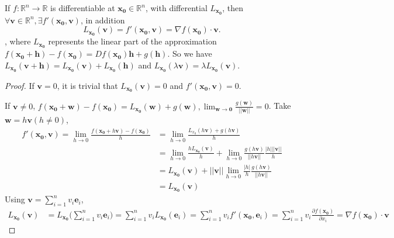 \begin{proposition}
    If $f: \mathbb{R}^{n} \to \mathbb{R}$ is differentiable at $\mathbf{x_0}\in \mathbb{R}^{n}$, with differential $L_\mathbf{x_0}$, then $\forall \mathbf{v} \in \mathbb{R}^{n}, \exists f'(\mathbf{x_0}, \mathbf{v})$, in addition \[
        L_\mathbf{x_0}(\mathbf{v}) = f'(\mathbf{x_0},\mathbf{v})= \nabla f(\mathbf{x_0}) \cdot \mathbf{v}.
    \]
    , where $L_\mathbf{x_0}$ represents the linear part of the approximation $f(\mathbf{x_0}+\mathbf{h})-f(\mathbf{x_0}) = Df(\mathbf{x_0})\mathbf{h}+g(\mathbf{h})$. So we have $L_\mathbf{x_0}(\mathbf{v} + \mathbf{h})= L_\mathbf{x_0}(\mathbf{v})+L_\mathbf{x_0}(\mathbf{h})$ and $L_\mathbf{x_0}(\lambda \mathbf{v})=\lambda L_\mathbf{x_0}(\mathbf{v})$.
\end{proposition}

\begin{proof}
    If $\mathbf{v} = 0$, it is trivial that $L_{\mathbf{x_0}}(\mathbf{v}) = 0$ and $f'(\mathbf{x_0},\mathbf{v}) = 0$.

    If $\mathbf{v} \neq 0$, $f(\mathbf{x_0} + \mathbf{w}) - f(\mathbf{x_0})= L_\mathbf{x_0}(\mathbf{w}) + g(\mathbf{w}), \lim_{\mathbf{w} \to \mathbf{0}} \frac{g(\mathbf{w})}{||\mathbf{w}||} = 0$. Take $\mathbf{w} = h \mathbf{v} (h \neq 0)$, \begin{align*}
        f'(\mathbf{x_0},\mathbf{v}) = \lim_{h \to 0} \frac{f(\mathbf{x_0}+h \mathbf{v}) - f(\mathbf{x_0})}{h}
         & = \lim_{h \to 0} \frac{L_{x_0}(h \mathbf{v}) + g(h \mathbf{v})}{h}                                                                           \\
         & =\lim_{h \to 0} \frac{h L_\mathbf{x_0}(\mathbf{v})}{h} + \lim_{h \to 0} \frac{g(h \mathbf{v})}{||h \mathbf{v}||} \frac{|h|||\mathbf{v}||}{h} \\
         & = L_\mathbf{x_0}(\mathbf{v}) + ||\mathbf{v}|| \lim_{h \to 0} \frac{|h|}{h}\frac{g(h \mathbf{v})}{||h \mathbf{v}||}                           \\
         & = L_\mathbf{x_0}(\mathbf{v})
    \end{align*}
    Using $\mathbf{v} = \sum_{i=1}^{n} v_i \mathbf{e}_i$, \begin{align*}
        L_\mathbf{x_0}(\mathbf{v}) & = L_\mathbf{x_0}\Big(\sum_{i=1}^{n} v_i \mathbf{e}_i \Big) = \sum_{i=1}^{n} v_i L_\mathbf{x_0}(\mathbf{e}_i) = \sum_{i=1}^{n} v_i f'(\mathbf{x_0}, \mathbf{e}_i) = \sum_{i=1}^{n} v_i \frac{\partial f(\mathbf{x_0})}{\partial x_i} = \nabla f(\mathbf{x_0}) \cdot  \mathbf{v}
    \end{align*}
\end{proof}

